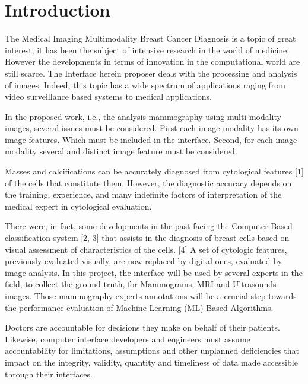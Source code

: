 
\chapter{Introduction}
\label{chapter:introduction}

The Medical Imaging Multimodality Breast Cancer Diagnosis is a topic of great interest, it has been the subject of intensive research in the world of medicine. However the developments in terms of innovation in the computational world are still scarce. The Interface herein proposer deals with the processing and analysis of images. Indeed, this topic has a wide spectrum of applications raging from video surveillance based systems to medical applications.

In the proposed work, i.e., the analysis mammography using multi-modality images, several issues must be considered. First each image modality has its own image features. Which must be included in the interface. Second, for each image modality several and distinct image feature must be considered.

Masses and calcifications can be accurately diagnosed from cytological features [1] of the cells that constitute them. However, the diagnostic accuracy depends on the training, experience, and many indefinite factors of interpretation of the medical expert in cytological evaluation.

There were, in fact, some developments in the past facing the Computer-Based classification system [2, 3] that assists in the diagnosis of breast cells based on visual assessment of characteristics of the cells. [4] A set of cytologic features, previously evaluated visually, are now replaced by digital ones, evaluated by image analysis. In this project, the interface will be used by several experts in the field, to collect the ground truth, for Mammograms, MRI and Ultrasounds images. Those mammography experts annotations will be a crucial step towards the performance evaluation of Machine Learning (ML) Based-Algorithms.

Doctors are accountable for decisions they make on behalf of their patients. Likewise, computer interface developers and engineers must assume accountability for limitations, assumptions and other unplanned deficiencies that impact on the integrity, validity, quantity and timeliness of data made accessible through their interfaces.

